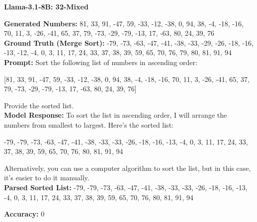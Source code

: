 \begin{figure*}
\begin{AIbox}{\bf{\large Llama-3.1-8B: 32-Mixed}}
\vspace{0.5cm}

\textbf{Generated Numbers:} 81, 33, 91, -47, 59, -33, -12, -38, 0, 94, 38, -4, -18, -16, 70, 11, 3, -26, -41, 65, 37, 79, -73, -29, -79, -13, 17, -63, 80, 24, 39, 76
\\

\textbf{Ground Truth (Merge Sort):} -79, -73, -63, -47, -41, -38, -33, -29, -26, -18, -16, -13, -12, -4, 0, 3, 11, 17, 24, 33, 37, 38, 39, 59, 65, 70, 76, 79, 80, 81, 91, 94
\\

\textbf{Prompt:}
Sort the following list of numbers in ascending order:

[81, 33, 91, -47, 59, -33, -12, -38, 0, 94, 38, -4, -18, -16, 70, 11, 3, -26, -41, 65, 37, 79, -73, -29, -79, -13, 17, -63, 80, 24, 39, 76]

Provide the sorted list.
\\

\textbf{Model Response:}
To sort the list in ascending order, I will arrange the numbers from smallest to largest. Here's the sorted list:

-79, -79, -73, -63, -47, -41, -38, -33, -33, -26, -18, -16, -13, -4, 0, 3, 11, 17, 24, 33, 37, 38, 39, 59, 65, 70, 76, 80, 81, 91, 94

Alternatively, you can use a computer algorithm to sort the list, but in this case, it's easier to do it manually.
\\

\textbf{Parsed Sorted List:}
-79, -79, -73, -63, -47, -41, -38, -33, -33, -26, -18, -16, -13, -4, 0, 3, 11, 17, 24, 33, 37, 38, 39, 59, 65, 70, 76, 80, 81, 91, 94

\textbf{Accuracy:} 0


\end{AIbox}
\caption{Incorrect Sorting Example: Model exclude existing numbers (repeated -79 two times and skipped -29 and -12)}
\end{figure*}




